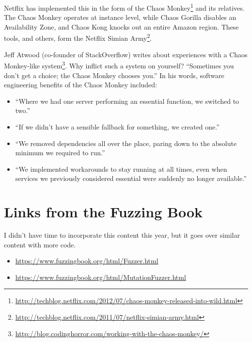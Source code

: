 \documentclass[11pt]{article}
\begin{document}
Netflix has implemented this in the form of the Chaos
Monkey\footnote{\url{http://techblog.netflix.com/2012/07/chaos-monkey-released-into-wild.html}}
and its relatives. The Chaos Monkey operates at instance level, while
Chaos Gorilla disables an Availability Zone, and Chaos Kong knocks out
an entire Amazon region. These tools, and others, form the Netflix
Simian
Army\footnote{\url{http://techblog.netflix.com/2011/07/netflix-simian-army.html}}.

Jeff Atwood (co-founder of StackOverflow) writes about experiences with a Chaos Monkey-like system\footnote{\url{http://blog.codinghorror.com/working-with-the-chaos-monkey/}}. Why inflict such a system on yourself? ``Sometimes you don't get a choice; the Chaos Monkey chooses you.'' In his words, software engineering benefits of the Chaos Monkey included:

\begin{itemize}[noitemsep]
\item    ``Where we had one server performing an essential function, we switched to two.''
\item    ``If we didn't have a sensible fallback for something, we created one.''
\item    ``We removed dependencies all over the place, paring down to the absolute minimum we required to run.''
\item     ``We implemented workarounds to stay running at all times, even when services we previously considered essential were suddenly no longer available.''
\end{itemize}

\section*{Links from the Fuzzing Book}

I didn't have time to incorporate this content this year, but it goes over similar content with more code.
\begin{itemize}[noitemsep]
  \item \url{https://www.fuzzingbook.org/html/Fuzzer.html}
  \item \url{https://www.fuzzingbook.org/html/MutationFuzzer.html}
\end{itemize}

\end{document}
